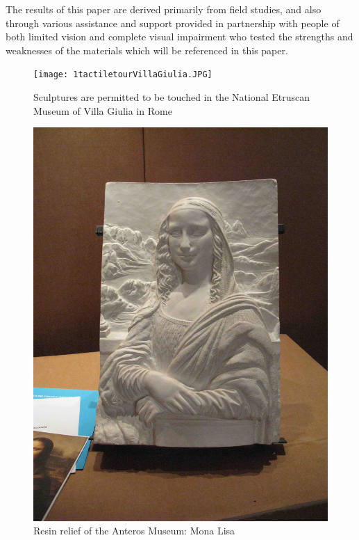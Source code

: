 \documentclass[amsthm,ebook]{saparticle}
\begin{document}
The results of this paper are derived primarily from field studies, and also through various assistance and support
provided in partnership with people of both limited vision and complete visual impairment who tested the strengths and
weaknesses of the materials which will be referenced in this paper.


\begin{figure}[!hbp]
\centering
 \texttt{[image: 1tactiletourVillaGiulia.JPG]}
\caption{Sculptures are permitted to be touched in the National Etruscan Museum of Villa Giulia in Rome}
\label{fig:1}
\end{figure}


\begin{figure}[!hbp]
\centering
 \includegraphics[width=\columnwidth]{2resinreliefMonaLisa.JPG}
\caption{Resin relief of the Anteros Museum: Mona Lisa}
\label{fig:2}
\end{figure}
\end{document}
